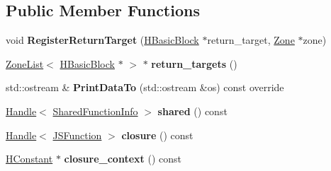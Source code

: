 \subsection*{Public Member Functions}
\begin{DoxyCompactItemize}
\item 
void {\bfseries Register\+Return\+Target} (\hyperlink{classv8_1_1internal_1_1_h_basic_block}{H\+Basic\+Block} $\ast$return\+\_\+target, \hyperlink{classv8_1_1internal_1_1_zone}{Zone} $\ast$zone)\hypertarget{classv8_1_1internal_1_1_h_enter_inlined_a288743b2689a759c98e1328a1c7921f9}{}\label{classv8_1_1internal_1_1_h_enter_inlined_a288743b2689a759c98e1328a1c7921f9}

\item 
\hyperlink{classv8_1_1internal_1_1_zone_list}{Zone\+List}$<$ \hyperlink{classv8_1_1internal_1_1_h_basic_block}{H\+Basic\+Block} $\ast$ $>$ $\ast$ {\bfseries return\+\_\+targets} ()\hypertarget{classv8_1_1internal_1_1_h_enter_inlined_ae3d37ac8b23801f12560dd030643e705}{}\label{classv8_1_1internal_1_1_h_enter_inlined_ae3d37ac8b23801f12560dd030643e705}

\item 
std\+::ostream \& {\bfseries Print\+Data\+To} (std\+::ostream \&os) const  override\hypertarget{classv8_1_1internal_1_1_h_enter_inlined_a75a059aad2a37975cb65070d219c6e08}{}\label{classv8_1_1internal_1_1_h_enter_inlined_a75a059aad2a37975cb65070d219c6e08}

\item 
\hyperlink{classv8_1_1internal_1_1_handle}{Handle}$<$ \hyperlink{classv8_1_1internal_1_1_shared_function_info}{Shared\+Function\+Info} $>$ {\bfseries shared} () const \hypertarget{classv8_1_1internal_1_1_h_enter_inlined_a884de38decd7038a5c76b83662e27091}{}\label{classv8_1_1internal_1_1_h_enter_inlined_a884de38decd7038a5c76b83662e27091}

\item 
\hyperlink{classv8_1_1internal_1_1_handle}{Handle}$<$ \hyperlink{classv8_1_1internal_1_1_j_s_function}{J\+S\+Function} $>$ {\bfseries closure} () const \hypertarget{classv8_1_1internal_1_1_h_enter_inlined_a5faf1f7bab3fc98173966c75b81fe46e}{}\label{classv8_1_1internal_1_1_h_enter_inlined_a5faf1f7bab3fc98173966c75b81fe46e}

\item 
\hyperlink{classv8_1_1internal_1_1_h_constant}{H\+Constant} $\ast$ {\bfseries closure\+\_\+context} () const \hypertarget{classv8_1_1internal_1_1_h_enter_inlined_a2c98dfe85019c89174264797345e3110}{}\label{classv8_1_1internal_1_1_h_enter_inlined_a2c98dfe85019c89174264797345e3110}


\end{DoxyCompactItemize}
